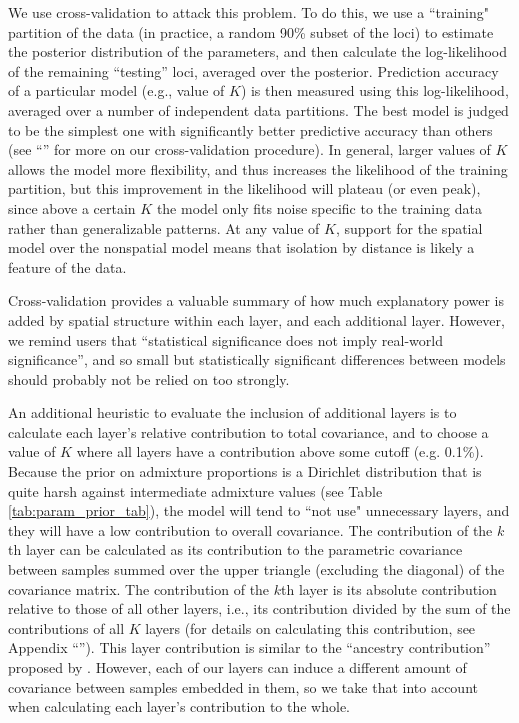 \documentclass[12pt]{article}
\newcommand{\secref}[1]{``\nameref{#1}''}
\begin{document}
We use cross-validation \citep[similar in spirit to][]{ADMIXTURE_xval} to attack this problem.
To do this,
we use a ``training" partition of the data (in practice, a random 90\% subset of the loci)
to estimate the posterior distribution of the parameters,
and then calculate the log-likelihood of the remaining ``testing'' loci,
averaged over the posterior.
Prediction accuracy of a particular model (e.g., value of $K$)
is then measured using this log-likelihood,
averaged over a number of independent data partitions.
The best model is judged to be the simplest one with significantly better predictive accuracy
than others (see \secref{Xvalidation} for more on our cross-validation procedure).
In general, larger values of $K$ allows the model more flexibility,
and thus increases the likelihood of the training partition, 
but this improvement in the likelihood will plateau (or even peak), 
since above a certain $K$ the model only fits noise specific to the training data 
rather than generalizable patterns.
At any value of $K$, support for the spatial model over the nonspatial model 
means that isolation by distance is likely a feature of the data.

Cross-validation provides a valuable summary of how much explanatory power
is added by spatial structure within each layer, and each additional layer.
However, we remind users that ``statistical significance does not imply real-world significance'',
and so small but statistically significant differences between models
should probably not be relied on too strongly.

An additional heuristic to evaluate the inclusion of additional layers is to calculate 
each layer's relative contribution to total covariance, 
and to choose a value of $K$ where all layers have a contribution above some cutoff (e.g. 0.1\%).
Because the prior on admixture proportions is a Dirichlet distribution 
that is quite harsh against intermediate admixture values (see Table \ref{tab:param_prior_tab}),  
the model will tend to ``not use" unnecessary layers, 
and they will have a low contribution to overall covariance.
The contribution of the $k$th layer can be calculated as
its contribution to the parametric covariance between samples 
summed over the upper triangle (excluding the diagonal) of the covariance matrix.
The contribution of the $k$th layer is its absolute contribution relative to those of all other layers, 
i.e., its contribution divided by the sum of the contributions of all $K$ layers
(for details on calculating this contribution, see Appendix \secref{layer_contribution}). 
This layer contribution is similar to the ``ancestry contribution'' proposed by \cite{fastStructure}. 
However, each of our layers can induce a different amount of covariance between samples embedded in them, 
so we take that into account when calculating each layer's contribution to the whole.
\end{document}
